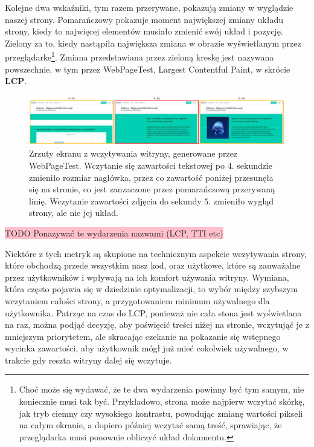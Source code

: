 \documentclass[licencjacka]{pracadypl}
\newcommand{\selfnote}[1]{\colorbox{pink}{#1}}
\begin{document}
Kolejne dwa wskaźniki, tym razem przerywane, pokazują zmiany w wyglądzie naszej strony. Pomarańczowy pokazuje moment największej zmiany układu strony, kiedy to najwięcej elementów musiało zmienić swój układ i pozycję. Zielony za to, kiedy nastąpiła największa zmiana w obrazie wyświetlanym przez przeglądarke\footnote{Choć może się wydawać, że te dwa wydarzenia powinny być tym samym, nie koniecznie musi tak być. Przykładowo, strona może najpierw wczytać skórkę, jak tryb ciemny czy wysokiego kontrastu, powodując zmianę wartości pikseli na całym ekranie, a dopiero później wczytać samą treść, sprawiając, że przeglądarka musi ponownie obliczyć układ dokumentu.}. Zmiana przedstawiana przez zieloną kreskę jest nazywana powszechnie, w tym przez WebPageTest, Largest Contentful Paint, w skrócie \textbf{LCP}.

\begin{figure}[H]
  \includegraphics[width=\linewidth]{images/filmstrip.png}
  \caption{Zrzuty ekranu z wczytywania witryny, generowane przez WebPageTest. Wczytanie się zawartości tekstowej po $4.$ sekundzie zmieniło rozmiar nagłówka, przez co zawartość poniżej przesunęła się na stronie, co jest zanzaczone przez pomarańczową przerywaną linię. Wczytanie zawartości zdjęcia do sekundy $5.$ zmieniło wygląd strony, ale nie jej układ. }
  \label{fig:loading-layout-and-lcp}
\end{figure}

\selfnote{TODO Ponazywać te wydarzenia nazwami (LCP, TTI etc)}

Niektóre z tych metryk są skupione na technicznym aspekcie wczytywania strony, które obchodzą przede wszystkim nasz kod, oraz użytkowe, które są zauważalne przez użytkowników i wpływają na ich komfort używania witryny. Wymiana, która często pojawia się w dziedzinie optymalizacji, to wybór między szybszym wczytaniem całości strony, a przygotowaniem minimum używalnego dla użytkownika. Patrząc na czas do LCP, ponieważ nie cała stona jest wyświetlana na raz, można podjąć decyzję, aby poświęcić treści niżej na stronie, wczytująć je z mniejszym priorytetem, ale skracając czekanie na pokazanie się wstępnego wycinka zawartości, aby użytkownik mógł już mieć cokolwiek używalnego, w trakcie gdy reszta witryny dalej się wczytuje.
\end{document}

